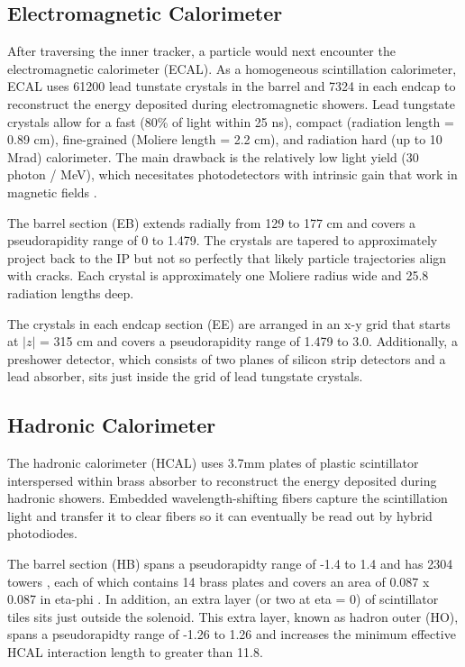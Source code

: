 \documentclass[12pt]{article}
\begin{document}
\subsection{Electromagnetic Calorimeter}
    After traversing the inner tracker, a particle would next encounter the electromagnetic calorimeter (ECAL). As a homogeneous scintillation calorimeter, ECAL uses 61200 lead tunstate crystals in the barrel and 7324 in each endcap to reconstruct the energy deposited during electromagnetic showers. Lead tungstate crystals allow for a fast (80\% of light within 25 ns), compact (radiation length = 0.89 cm), fine-grained (Moliere length = 2.2 cm), and radiation hard (up to 10 Mrad) calorimeter. The main drawback is the relatively low light yield (30 photon / MeV), which necesitates photodetectors with intrinsic gain that work in magnetic fields . 

    The barrel section (EB) extends radially from 129 to 177  cm and covers a pseudorapidity range of 0 to 1.479. The crystals are tapered to approximately project back to the IP but not so perfectly that likely particle trajectories align with cracks. Each crystal is approximately one Moliere radius wide and 25.8 radiation lengths deep.

    The crystals in each endcap section (EE) are arranged in an x-y grid that starts at $|z|$ = 315 cm and covers a pseudorapidity range of 1.479 to 3.0. Additionally, a preshower detector, which consists of two planes of silicon strip detectors and a lead absorber, sits just inside the grid of lead tungstate crystals. 

\subsection{Hadronic Calorimeter}
    The hadronic calorimeter (HCAL) uses 3.7mm plates of plastic scintillator interspersed within brass absorber to reconstruct the energy deposited during hadronic showers. Embedded wavelength-shifting fibers capture the scintillation light and transfer it to clear fibers so it can eventually be read out by hybrid photodiodes.

    The barrel section (HB) spans a pseudorapidty range of -1.4 to 1.4 and has 2304 towers , each of which contains 14  brass plates and covers an area of 0.087 x 0.087 in eta-phi . In addition, an extra layer (or two at eta = 0) of scintillator tiles sits just outside the solenoid. This extra layer, known as hadron outer (HO), spans a pseudorapidty range of -1.26 to 1.26 and increases the minimum effective HCAL interaction length to greater than 11.8.
\end{document}
